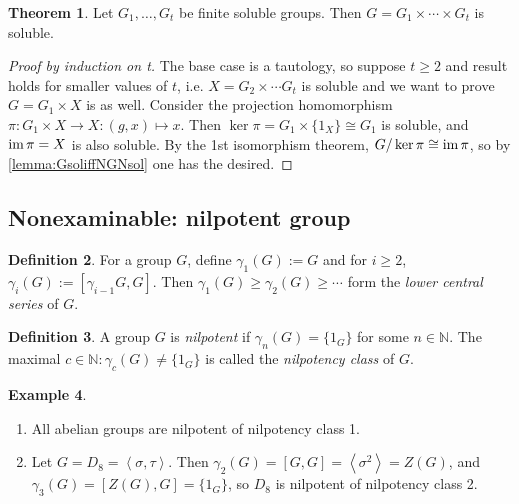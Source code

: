 \documentclass[a4paper]{article}
\newcommand{\la}{\left\langle}
\newcommand{\ra}{\right\rangle}
\newcommand{\N}{\mathbb{N}}
\newcommand{\im}{\text{im\,}}
\theoremstyle{definition}
\newtheorem{defn}{Definition}[subsection]
\newtheorem{thm}[defn]{Theorem}
\newtheorem{example}[defn]{Example}
\begin{document}
\begin{thm}
Let $G_1,\ldots,G_t$ be finite soluble groups. Then $G=G_1\times\cdots\times G_t$ is soluble.
\end{thm}
\begin{proof}[Proof by induction on t] The base case is a tautology, so suppose $t\geq 2$ and result holds for smaller values of $t$, i.e. $X=G_2\times\cdots G_t$ is soluble and we want to prove $G=G_1\times X$ is as well. Consider the projection homomorphism $\pi:G_1\times X\rightarrow X:(g,x)\mapsto x$. Then $\ker\pi=G_1\times \{1_X\}\cong G_1$ is soluble, and $\im\pi=X$ is also soluble. By the 1st isomorphism theorem, $G/\ker\pi\cong\im\pi$, so by \ref{lemma:GsoliffNGNsol} one has the desired.
\end{proof}

\subsection{Nonexaminable: nilpotent group}
\begin{defn}
For a group $G$, define $\gamma_1(G):=G$ and for $i\geq 2$, $\gamma_i(G):=[\gamma_{i-1}G,G]$. Then $\gamma_1(G)\geq\gamma_2(G)\geq\cdots$ form the \textit{lower central series} of $G$.
\end{defn}
\begin{defn}
A group $G$ is \textit{nilpotent} if $\gamma_n(G)=\{1_G\}$ for some $n\in\N$. The maximal $c\in\N:\gamma_c(G)\neq\{1_G\}$ is called the \textit{nilpotency class} of $G$.
\end{defn}
\begin{example}
\begin{enumerate}
\item All abelian groups are nilpotent of nilpotency class 1.
\item Let $G=D_8=\la \sigma,\tau\ra$. Then $\gamma_2(G)=[G,G]=\la\sigma^2\ra=Z(G)$, and $\gamma_3(G)=[Z(G),G]=\{1_G\}$, so $D_8$ is nilpotent of nilpotency class 2.
\end{enumerate}
\end{example}
\end{document}
